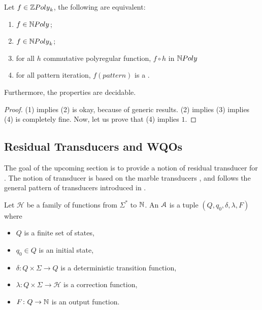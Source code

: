 \begin{theorem}
    \label{decide-n-poly-general:thm}
    Let $f \in \ZPoly[k]$, the following are equivalent:
    \begin{enumerate}
        \item $f \in \NPoly$;
        \item $f \in \NPoly[k]$;
        \item for all $h$ commutative polyregular function,
            $f \circ h$ in $\NPoly$
        \item for all pattern iteration,
            $f(pattern)$ is a .
    \end{enumerate}
    Furthermore, the properties are decidable.
\end{theorem}
\begin{proof}
    (1) implies (2) is okay, because of generic results.
    (2) implies (3) implies (4) is completely fine.
    Now, let us prove that (4) implies $1$.
\end{proof}


\subsection{Residual Transducers and WQOs}

The goal of the upcoming section is to provide a notion of residual transducer
for  . The notion of
transducer is based on the marble transducers \cite{EHB99}, and follows the
general pattern of transducers introduced in \cite{LOPEZ23b}.

\begin{definition}
    Let $\mathcal{H}$ be a family of functions
    from $\Sigma^*$ to $\mathbb{N}$.
    An  $\mathcal{A}$ is
    a tuple $(Q, q_0, \delta, \lambda, F)$ where
    \begin{itemize}
        \item $Q$ is a finite set of states,
        \item $q_0 \in Q$ is an initial state,
        \item $\delta \colon Q \times \Sigma \to Q$
            is a deterministic transition function,
        \item $\lambda \colon Q \times \Sigma \to \mathcal{H}$
            is a correction function,
        \item $F \colon Q \to \mathbb{N}$ is an output function.
    \end{itemize}
\end{definition}

